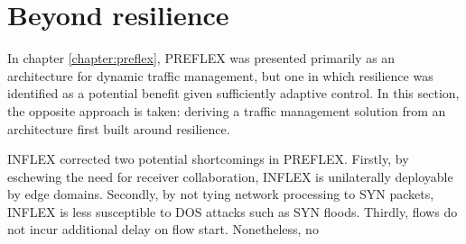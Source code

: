 \section{Beyond resilience}
\label{section:inflex:discussion}

In chapter \ref{chapter:preflex}, \ac{PREFLEX} was presented primarily as an architecture for dynamic traffic management, but one in which resilience was identified as a potential benefit given sufficiently adaptive control.
In this section, the opposite approach is taken: deriving a traffic management solution from an architecture first built around resilience.

INFLEX corrected two potential shortcomings in PREFLEX.
Firstly, by eschewing the need for receiver collaboration, INFLEX is unilaterally deployable by edge domains.
Secondly, by not tying network processing to SYN packets, INFLEX is less susceptible to \ac{DOS} attacks such as SYN floods.
Thirdly, flows do not incur additional delay on flow start.
Nonetheless, no 

\LOREM
\LOREM

\LOREM
\LOREM

\LOREM
\LOREM

